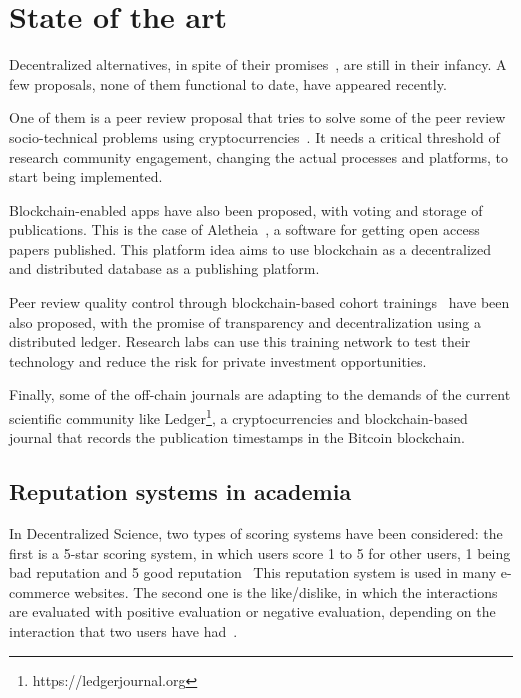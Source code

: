 \section{State of the art}


Decentralized alternatives, in spite of their
promises~\cite{bartlingblockchain}, are still in their infancy. A few proposals,
none of them functional to date, have appeared recently.

One of them is a peer review proposal that tries to solve some of the peer
review socio-technical problems using cryptocurrencies~\cite{tennant2017multi}.
It needs a critical threshold of research community engagement, changing the
actual processes and platforms, to start being implemented.

Blockchain-enabled apps have also been proposed, with voting and storage of
publications. This is the case of Aletheia~\cite{morton2017aletheia}, a software
for getting open access papers published. This platform idea aims to use
blockchain as a decentralized and distributed database as a publishing platform.

Peer review quality control through blockchain-based cohort
trainings~\cite{dhillon2016bench} have been also proposed, with the promise of
transparency and decentralization using a distributed ledger. Research labs can
use this training network to test their technology and reduce the risk for
private investment opportunities.

Finally, some of the off-chain journals are adapting to the demands of the
current scientific community like Ledger\footnote{https://ledgerjournal.org}, a
cryptocurrencies and blockchain-based journal that records the publication
timestamps in the Bitcoin blockchain.

\subsection{Reputation systems in academia}
\label{soa:rs}

In Decentralized Science, two types of scoring systems have been considered: the
first is a 5-star scoring system, in which users score 1 to 5 for other users, 1
being bad reputation and 5 good reputation~\cite{} This reputation system is
used in many e-commerce websites. The second one is the like/dislike, in which
the interactions are evaluated with positive evaluation or negative evaluation,
depending on the interaction that two users have had~\cite{}.

